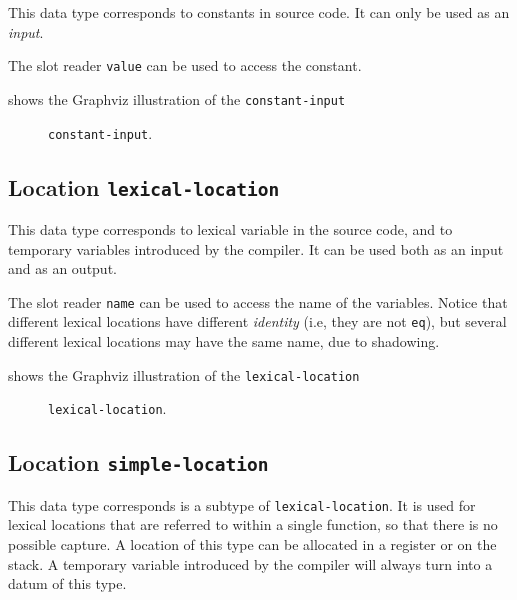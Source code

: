 This data type corresponds to constants in source code.  It can only
be used as an \emph{input}.

The slot reader \texttt{value} can be used to access the constant. 

 shows the Graphviz illustration of the
\texttt{constant-input}

\begin{figure}
\begin{center}
\end{center}
\caption{\label{fig-constant-input}
\texttt{constant-input}.}
\end{figure}

\subsection{Location \texttt{lexical-location}}

This data type corresponds to lexical variable in the source code, and
to temporary variables introduced by the compiler.  It can be used
both as an input and as an output.

The slot reader \texttt{name} can be used to access the name of the
variables.  Notice that different lexical locations have different
\emph{identity} (i.e, they are not \texttt{eq}), but several different
lexical locations may have the same name, due to shadowing.

 shows the Graphviz illustration of the
\texttt{lexical-location}

\begin{figure}
\begin{center}
\end{center}
\caption{\label{fig-lexical-location}
\texttt{lexical-location}.}
\end{figure}

\subsection{Location \texttt{simple-location}}

This data type corresponds is a subtype of \texttt{lexical-location}.
It is used for lexical locations that are referred to within a single
function, so that there is no possible capture.  A location of this
type can be allocated in a register or on the stack.  A temporary
variable introduced by the compiler will always turn into a datum of
this type.

